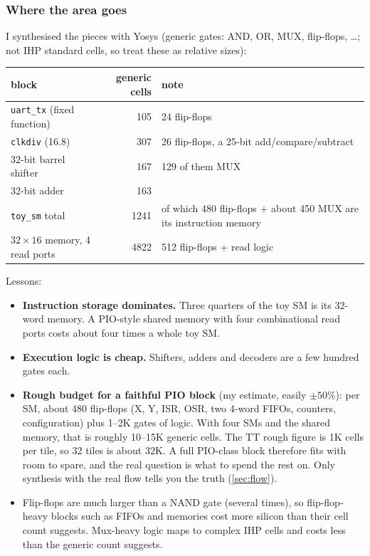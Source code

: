 \subsubsection{Where the area goes}\label{sec:area}
I synthesised the pieces with Yosys (generic gates: AND, OR, MUX, flip-flops,
\ldots; not IHP standard cells, so treat these as relative sizes):
\begin{center}
\begin{tabular}{|l|r|p{6.4cm}|}
\hline
block & generic cells & note \\ \hline
\texttt{uart\_tx} (fixed function) & 105 & 24 flip-flops \\
\texttt{clkdiv} (16.8) & 307 & 26 flip-flops, a 25-bit add/compare/subtract \\
32-bit barrel shifter & 167 & 129 of them MUX \\
32-bit adder & 163 & \\
\texttt{toy\_sm} total & 1241 & of which 480 flip-flops + about 450 MUX are
  its instruction memory \\
$32\times16$ memory, 4 read ports & 4822 & 512 flip-flops + read logic \\
\hline
\end{tabular}
\end{center}
Lessons:
\begin{itemize}
  \item \textbf{Instruction storage dominates.} Three quarters of the toy SM
    is its 32-word memory. A PIO-style shared memory with four
    combinational read ports costs about four times a whole toy SM.
  \item \textbf{Execution logic is cheap.} Shifters, adders and decoders are
    a few hundred gates each.
  \item \textbf{Rough budget for a faithful PIO block} (my estimate, easily
    $\pm50\%$): per SM, about 480 flip-flops (X, Y, ISR, OSR, two 4-word
    FIFOs, counters, configuration) plus 1--2K gates of logic. With four
    SMs and the shared memory, that is roughly 10--15K generic cells. The
    TT rough figure is 1K cells per tile, so 32 tiles is about 32K. A full
    PIO-class block therefore fits with room to spare, and the real question
    is what to spend the rest on. Only synthesis with the real flow tells
    you the truth (\cref{sec:flow}).
  \item Flip-flops are much larger than a NAND gate (several times), so
    flip-flop-heavy blocks such as FIFOs and memories cost more silicon
    than their cell count suggests. Mux-heavy logic maps to complex IHP
    cells and costs less than the generic count suggests.
\end{itemize}

